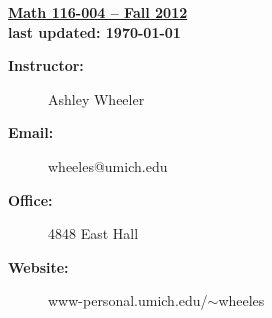 \documentclass[11pt,twoside]{article}
\begin{document}
\begin{center}
{\bf \Large \underline{Math 116-004 -- Fall 2012} \\
last updated: \today}
\end{center}

\vspace{.05in}

\begin{description}
\item[\bf Instructor:] Ashley Wheeler

\item[\bf Email:]  wheeles@umich.edu

\item[\bf Office:] 4848 East Hall

\item[\bf Website:] www-personal.umich.edu/$\sim $wheeles
\end{description}
\end{document}
